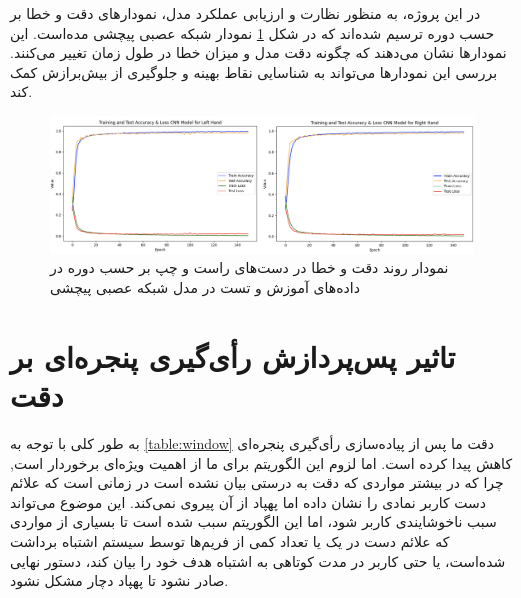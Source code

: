در این پروژه، به منظور نظارت و ارزیابی عملکرد مدل، نمودارهای دقت و خطا بر حسب دوره ترسیم شده‌اند که در شکل \ref{acc} نمودار شبکه عصبی پیچشی مده‌است. این نمودارها نشان می‌دهند که چگونه دقت مدل و میزان خطا در طول زمان تغییر می‌کنند. بررسی این نمودارها می‌تواند به شناسایی نقاط بهینه و جلوگیری از بیش‌برازش کمک کند.





\begin{figure}[h]
    \centering
    \includegraphics[width=1\textwidth]{Chart_CNN.png}
    \caption{نمودار روند دقت و خطا در دست‌های راست و چپ بر حسب دوره در داده‌های آموزش و تست در مدل شبکه عصبی پیچشی}
    \label{acc}
\end{figure}




\section{تاثیر پس‌پردازش رأی‌گیری پنجره‌ای بر دقت}
به طور کلی با توجه به 
\cref{table:window}
 دقت ما پس از پیاده‌سازی رأی‌گیری پنجره‌ای کاهش پیدا کرده است. اما لزوم این الگوریتم برای ما از اهمیت ویژه‌ای برخوردار است, چرا که در بیشتر مواردی که دقت به درستی بیان نشده است در زمانی است که علائم دست کاربر نمادی را نشان داده اما پهپاد از آن پیروی نمی‌کند. این موضوع می‌تواند سبب ناخوشایندی کاربر شود، اما این الگوریتم سبب شده است تا بسیاری از
 مواردی که علائم دست در یک یا تعداد کمی از فریم‌ها توسط سیستم اشتباه برداشت شده‌است، یا حتی کاربر در مدت کوتاهی به اشتباه هدف خود را بیان کند، دستور نهایی صادر نشود تا پهپاد دچار مشکل نشود.

